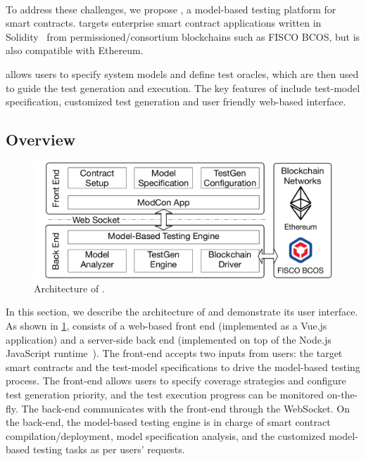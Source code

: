\paragraph{\modcon}
To address these challenges, we propose \modcon, a model-based testing platform for smart contracts.
\modcon targets enterprise smart contract applications written in Solidity~\cite{solidity} from permissioned/consortium blockchains such as FISCO BCOS, but is also compatible with Ethereum.

\modcon allows users to specify system models and define test oracles, which are then used to guide
the test generation and execution.
The key features of \modcon include test-model specification, customized test generation and user friendly web-based interface.

\subsection{\modcon Overview}
\label{sec:Overview}

\begin{figure}[t]
	\centering
	\includegraphics[width=.9\columnwidth]{Figures/Chapter3/modcon-arch.pdf}
	\caption{Architecture of \modcon.}
	\label{fig:architecture}
\end{figure}

In this section, we describe the architecture of \modcon and demonstrate its user interface.
As shown in \cref{fig:architecture}, \modcon consists of a web-based front end (implemented as a
Vue.js~\cite{vuejs} application) and a server-side back end (implemented on top of the Node.js
JavaScript runtime~\cite{nodejs}).
The front-end accepts two inputs from users: the target smart contracts
and the test-model specifications to drive the model-based testing process.
The front-end allows users to specify coverage strategies and configure test generation priority,
and the test execution progress can be monitored on-the-fly.
The back-end communicates with the front-end through the WebSocket.
On the back-end, the model-based testing engine is in charge of smart contract
compilation/deployment, model specification analysis, and the customized model-based testing tasks
as per users' requests.

